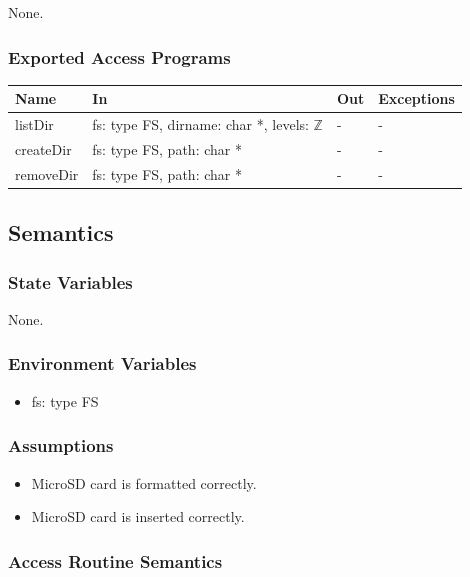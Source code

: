 \documentclass[12pt, titlepage]{article}
\begin{document}
None.

\subsubsection{Exported Access Programs}

\begin{center}
\begin{tabular}{p{2cm} p{4cm} p{3.5cm} p{4cm}}
\hline
\textbf{Name} & \textbf{In} & \textbf{Out} & \textbf{Exceptions} \\
\hline
listDir & fs: type FS, dirname: char *, levels: $\mathbb{Z}$ & - & - \\
createDir & fs: type FS, path: char * & - & - \\
removeDir & fs: type FS, path: char * & - & - \\
\hline
\end{tabular}
\end{center}

\subsection{Semantics}

\subsubsection{State Variables}

None.

\subsubsection{Environment Variables}
\begin{itemize}
\item fs: type FS
\end{itemize}

\subsubsection{Assumptions}
\begin{itemize}
\item MicroSD card is formatted correctly.
\item MicroSD card is inserted correctly.
\end{itemize}
\subsubsection{Access Routine Semantics}
\end{document}
